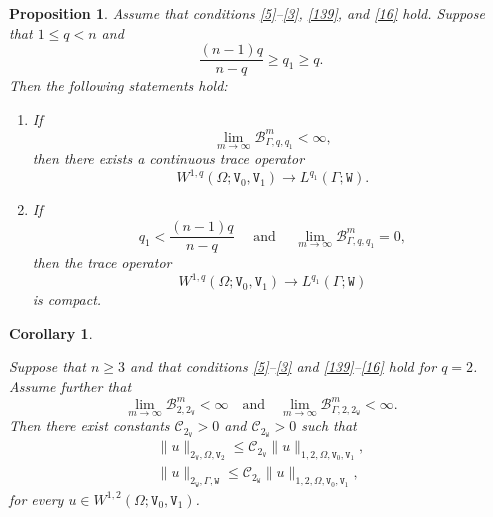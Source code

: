 \documentclass[reqno, 11pt, a4paper]{amsart}
\newtheorem{proposition}[theorem]{Proposition}
\newtheorem{corollary}[theorem]{Corollary}
\numberwithin{equation}{section}
\newcommand{\xv}{2_{\mathtt{V}}}
\newcommand{\xw}{2_{\mathtt{W}}}
\newcommand{\qxv}{q_{\mathtt{V}}}
\newcommand{\qxw}{q_{\mathtt{W}}}
\newcommand{\wghtv}{\mathtt{V}}
\newcommand{\wghtw}{\mathtt{W}}
\newcommand{\qxp}{q}
\begin{document}
\begin{proposition} \label{56}
Assume that conditions \ref{5}--\ref{3}, \ref{139},  and \ref{16} hold. Suppose that \(1\leq\qxp<n\) and
\[
 \frac{(n-1)\qxp }{n - \qxp}  \geq \qxp _1 \geq \qxp.
\]
Then the following statements hold:
 \begin{enumerate}[label=(\roman*)]
\item If  
$$
\lim _{m \rightarrow \infty} \mathcal{B} _{ \Gamma , \qxp , \qxp _1 } ^m <\infty,
$$
 then there exists a continuous trace operator $$
 W^{1, \qxp  } ( \Omega ; \wghtv_0, \wghtv_1 ) \rightarrow L^{\qxp _1}  (\Gamma ; \wghtw).
 $$

\item  If 
$$
\qxp _1<\frac{(n-1)\qxp}{n-\qxp} \quad \text { and } \quad \lim _{m \rightarrow \infty} \mathcal{B} _{ \Gamma , \qxp , \qxp _1 } ^m =0,
$$
 then the trace operator 
 $$
 W^{1, \qxp  } (\Omega ; \wghtv _0, \wghtv _1 ) \rightarrow L^{\qxp _1 }  (\Gamma ; \wghtw)
 $$
  is compact.
\end{enumerate}
\end{proposition}


\begin{corollary}\label{57}

Suppose that \(n\geq3\) and that conditions \ref{5}--\ref{3} and \ref{139}--\ref{16} hold for \(\qxp=2\). Assume further that
\[
\lim_{m\rightarrow\infty}\mathcal B_{2,\xv}^m<\infty
\quad\text{and}\quad
\lim_{m\rightarrow\infty}\mathcal B_{\Gamma , 2,\xw}^m<\infty.
\]
Then there exist constants \(\mathcal C_{\xv}>0\) and \(\mathcal C_{\xw}>0\) such that
\begin{gather}
\|u\|_{\xv,\Omega,\wghtv_2}
\leq
\mathcal C_{\xv}\|u\|_{1,2,\Omega,\wghtv_0,\wghtv_1},
\label{62}\\[5pt]
\|u\|_{\xw,\Gamma,\wghtw}
\leq
\mathcal C_{\xw}\|u\|_{1,2,\Omega,\wghtv_0,\wghtv_1},
\label{63}
\end{gather}
for every \(u\in W^{1,2}(\Omega;\wghtv_0,\wghtv_1)\).
\end{corollary}
\end{document}
